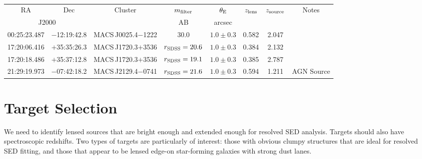 \documentclass{emulateapj}
\begin{document}
% 
 \begin{center}
 \begin{table*}[t]
 \begin{center}
 \scriptsize
 \caption{\label{tab:data}}
 \begin{tabular}{cccccccc}
 \hline\hline
 \multicolumn{1}{c}{RA} & 
 \multicolumn{1}{c}{Dec} & 
 \multicolumn{1}{c}{Cluster} & 
 \multicolumn{1}{c}{$m_{\rm filter}$} &
 \multicolumn{1}{c}{$\theta_{\rm E}$} & 
 \multicolumn{1}{c}{$z_{\rm lens}$} & 
 \multicolumn{1}{c}{$z_{\rm source}$}&
 \multicolumn{1}{c}{Notes}\\
 \multicolumn{2}{c}{J2000} & 
 \multicolumn{1}{c}{} & 
 \multicolumn{1}{c}{AB} & 
 \multicolumn{1}{c}{arcsec} & 
 \multicolumn{1}{c}{} & 
 \multicolumn{1}{c}{} & 
 \multicolumn{1}{c}{}\\
 \hline
 00:25:23.487 & $-$12:19:42.8 & MACS\,J0025.4$-$1222  & $30.0$                  & $1.0\pm0.3$ & 0.582 & 2.047 & \\
 17:20:06.416 & $+$35:35:26.3 & MACS\,J1720.3$+$3536 & $r_{\rm SDSS}=20.6$ & $1.0\pm0.3$ & 0.384 & 2.132 & \\
 17:20:18.486 & $+$35:37:12.8 & MACS\,J1720.3$+$3536 & $r_{\rm SDSS}=19.1$ & $1.0\pm0.3$ & 0.385 & 2.787 & \\
 21:29:19.973 & $-$07:42:18.2 & MACS\,J2129.4$-$0741 & $r_{\rm SDSS}=21.6$  & $1.0\pm0.3$ & 0.594 & 1.211 & AGN Source\\
 \end{tabular}
 \end{center}
 \end{table*}
 \end{center}


% 
% 


\section{Target Selection}\label{targets}

We need to identify lensed sources that are bright enough and extended
enough for resolved SED analysis.  Targets should also have
spectroscopic redshifts.  Two types of targets are particularly of
interest: those with obvious clumpy structures that are ideal for
resolved SED fitting, and those that appear to be lensed edge-on
star-forming galaxies with strong dust lanes.
\end{document}
